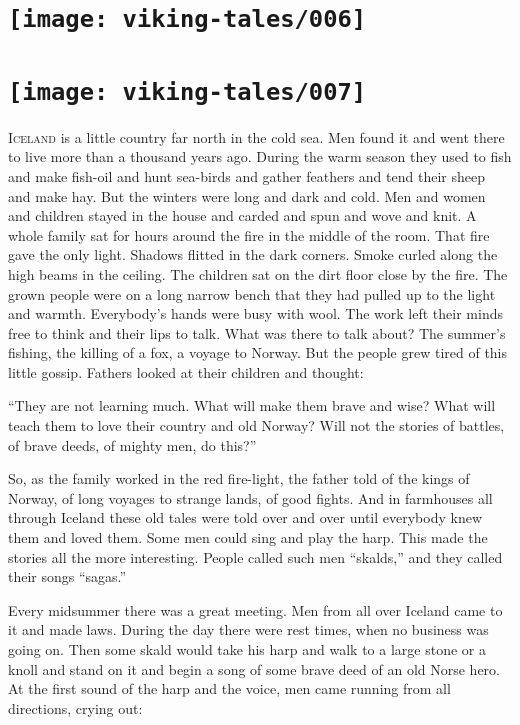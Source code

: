 \chapter[A List of the Illustrations]{\texttt{[image: viking-tales/006]}}
\listoffigures

\chapter[What the Sagas Were]{
    \texttt{[image: viking-tales/007]}}

\lettrine{I}{celand} is a little country far north in the cold sea. Men
found it and went there to live more than a thousand years ago. During
the warm season they used to fish and make fish-oil and hunt sea-birds
and gather feathers and tend their sheep and make hay. But the winters
were long and dark and cold. Men and women and children stayed in the
house and carded and spun and wove and knit. A whole family sat for hours
around the fire in the middle of the room. That fire gave the only light.
Shadows flitted in the dark corners. Smoke curled along the high beams
in the ceiling. The children sat on the dirt floor close by the fire.
The grown people were on a long narrow bench that they had pulled up to
the light and warmth. Everybody's hands were busy with wool. The work
left their minds free to think and their lips to talk. What was there to
talk about? The summer's fishing, the killing of a fox, a voyage to
Norway. But the people grew tired of this little gossip. Fathers looked
at their children and thought:

``They are not learning much. What will make them brave and wise? What
will teach them to love their country and old Norway? Will not the
stories of battles, of brave deeds, of mighty men, do this?''

So, as the family worked in the red fire-light, the father told of the
kings of Norway, of long voyages to strange lands, of good fights. And
in farmhouses all through Iceland these old tales were told over and
over until everybody knew them and loved them. Some men could sing and
play the harp. This made the stories all the more interesting. People
called such men ``skalds,'' and they called their songs ``sagas.''

Every midsummer there was a great meeting. Men from all over Iceland
came to it and made laws. During the day there were rest times, when no
business was going on. Then some skald would take his harp and walk to a
large stone or a knoll and stand on it and begin a song of some brave
deed of an old Norse hero. At the first sound of the harp and the voice,
men came running from all directions, crying out:


